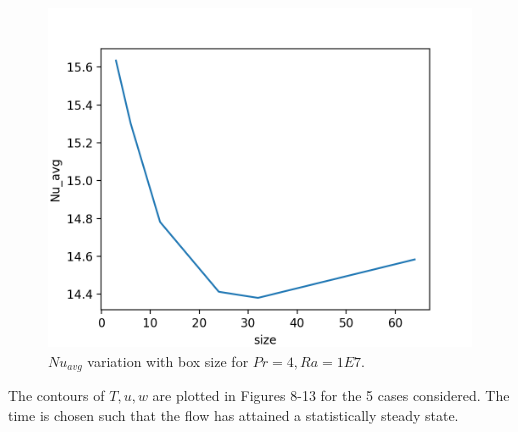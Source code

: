 \documentclass[12pt]{article}
\begin{document}
      \begin{figure}[!htb]
      	\includegraphics[width=\linewidth]{Nu_avg_1E7_4.png}
      	\caption{$Nu_{avg}$ variation with box size for $Pr = 4, Ra = 1E7$.}
      	\label{fig:fig7}
      \end{figure} 
      
      The contours of $T,u,w$ are plotted in Figures 8-13 for the 5 cases considered. The time is chosen such that the flow has attained a statistically steady state.
      
\end{document}

